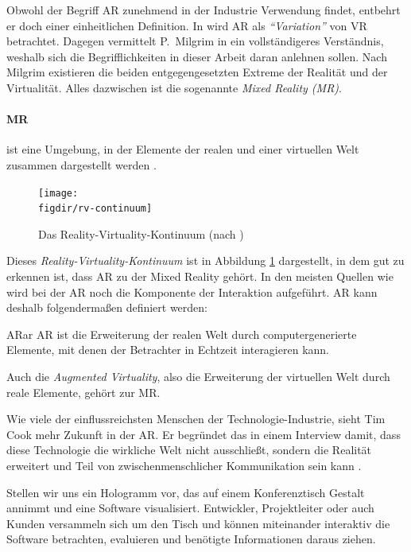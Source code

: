 Obwohl der Begriff AR zunehmend in der Industrie Verwendung findet, entbehrt er doch einer einheitlichen Definition. In \cite{azuma1997survey} wird AR als \emph{"`Variation"'} von VR betrachtet. Dagegen vermittelt P.\ Milgrim in \cite{milgram1995augmented} ein vollständigeres Verständnis, weshalb sich die Begrifflichkeiten in dieser Arbeit daran anlehnen sollen. Nach Milgrim existieren die beiden entgegengesetzten Extreme der Realität und der Virtualität. Alles dazwischen ist die sogenannte \emph{Mixed Reality (MR)}.

\paragraph{MR} ist eine Umgebung, in der Elemente der realen und einer virtuellen Welt zusammen dargestellt werden \cite{kato1999marker}.\\

\begin{figure}[htb]
  \texttt{[image: \\figdir/rv-continuum]}
  \caption{Das Reality-Virtuality-Kontinuum (nach \cite{milgram1995augmented})}
  \label{fig:rv-continuum}
\end{figure}

Dieses \emph{Reality-Virtuality-Kontinuum} ist in Abbildung \ref{fig:rv-continuum} dargestellt, in dem gut zu erkennen ist, dass AR zu der Mixed Reality gehört. In den meisten Quellen wie \cite{azuma1997survey, azuma2001recent, kato1999marker} wird bei der AR noch die Komponente der Interaktion aufgeführt. AR kann deshalb folgendermaßen definiert werden:

\begin{defbox}{AR}{ar}
   AR ist die Erweiterung der realen Welt durch computergenerierte Elemente, mit denen der Betrachter in Echtzeit interagieren kann.
\end{defbox}

Auch die \emph{Augmented Virtuality}, also die Erweiterung der virtuellen Welt durch reale Elemente, gehört zur MR.

Wie viele der einflussreichsten Menschen der Technologie-Industrie, sieht Tim Cook mehr Zukunft in der AR. Er begründet das in einem Interview damit, dass diese Technologie die wirkliche Welt nicht ausschließt, sondern die Realität erweitert und Teil von zwischenmenschlicher Kommunikation sein kann \cite{theindependent2017apple}.

Stellen wir uns ein Hologramm vor, das auf einem Konferenztisch Gestalt annimmt und eine Software visualisiert. Entwickler, Projektleiter oder auch Kunden versammeln sich um den Tisch und können miteinander interaktiv die Software betrachten, evaluieren und benötigte Informationen daraus ziehen.

